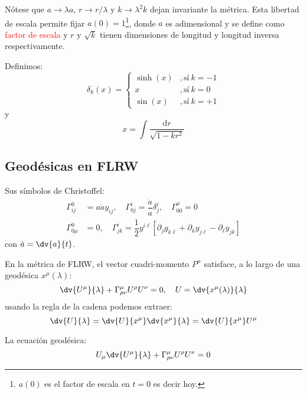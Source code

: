 \documentclass[../main]{subfiles}
\begin{document}
Nótese que $a\rightarrow \lambda a$, $r\rightarrow r/\lambda$ y $k\rightarrow \lambda^2 k$ dejan invariante la métrica. Esta libertad de escala permite fijar $a(0)=1$\footnote{$a(0)$ es el factor de escala en $t=0$ es decir hoy.}, donde $a$ es adimensional y se define como \textcolor{red}{factor de escala} y $r$ y $\sqrt{k}$ tienen dimensiones de longitud y longitud inversa respectivamente.

Definimos:
\begin{equation}
    \delta_k(x)=
    \left\{
    \begin{matrix}
        \sinh(x) & ,\text{sí} \ k=-1\\
        x & ,\text{sí} \ k=0\\
        \sin(x) & ,\text{sí} \ k=+1
    \end{matrix}
    \right.
\end{equation}
y
\begin{equation}
    x=\int \dfrac{\mathrm{d}r}{\sqrt{1-kr^2}}
\end{equation}

\subsection{Geodésicas en FLRW}

Sus símbolos de Christoffel:
\begin{equation}
    \begin{split}
        \Gamma^0_{ij}&=a\dot{a}y_{ij},\quad \Gamma^{i}_{0j}=\dfrac{\dot{a}}{a}\delta^{i}_j,\quad \Gamma^{\mu}_{00}=0\\
        \Gamma^{0}_{0\mu}&=0,\quad \Gamma^{i}_{jk}=\dfrac{1}{2}y^{i\ell}\left[\partial_j g_{k\ell}+\partial_k y_{j\ell}-\partial_{\ell}y_{jk}\right]
    \end{split}
\end{equation}
con $\dot{a}=\dv{a}{t}$.

En la métrica de FLRW, el vector cuadri-momento $P^{\mu}$ satisface, a lo largo de una geodésica $x^{\mu}(\lambda)$:
\begin{equation}
    \dv{U^{\mu}}{\lambda}+\Gamma^{\mu}_{\rho\nu}U^{\rho}U^{\nu}=0,\quad U=\dv{x^{\mu}(\lambda)}{\lambda}
\end{equation}
usando la regla de la cadena podemos extraer:
\begin{equation}
    \dv{U}{\lambda}=\dv{U}{x^{\mu}}\dv{x^{\mu}}{\lambda}=\dv{U}{x^{\mu}}U^{\mu}
\end{equation}

La ecuación geodésica:
\begin{equation}
    U_{\mu}\dv{U^{\mu}}{\lambda}+\Gamma^{\mu}_{\rho\nu}U^{\rho}U^{\nu}=0
\end{equation}
\end{document}
